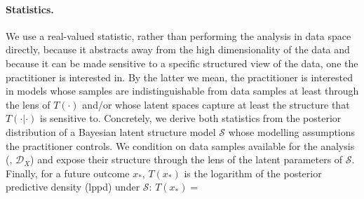 \paragraph{Statistics.} 
We use a real-valued statistic, rather than performing the analysis in data space directly, because it abstracts away from the high dimensionality of the data and because it can be made sensitive to a specific structured view of the data, one the practitioner is interested in.
By the latter we mean, the practitioner is interested in models whose samples are indistinguishable from data samples at least through the lens of $T(\cdot)$ and/or whose latent spaces capture at least the structure that $T(\cdot|\cdot)$ is sensitive to.
Concretely, we derive both statistics from the posterior distribution of a Bayesian latent structure model $\mathcal S$ whose modelling assumptions the practitioner controls. %
We condition on data samples available for the analysis (\eg, $\mathcal D_X$) and expose their structure through the lens of the latent parameters of $\mathcal S$.
Finally, for a future outcome $x_*$, $T(x_*)$ is the logarithm of the posterior predictive density (lppd) under $\mathcal S$: $T(x_*) = $
